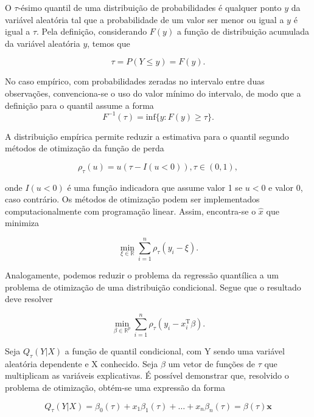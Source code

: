 O $\tau$-ésimo quantil de uma distribuição de probabilidades é qualquer ponto $y$ da variável aleatória tal que a probabilidade de um valor ser menor ou igual a $y$ é igual a $\tau$. Pela definição, considerando $F(y)$ a função de distribuição acumulada da variável aleatória $y$, temos que

\begin{equation}
\tau = P(Y \leq y) = F(y).
\end{equation}

No caso empírico, com probabilidades zeradas no intervalo entre duas observações, convenciona-se o uso do valor mínimo do intervalo, de modo que a definição para o quantil assume a forma
\begin{equation}
F^{-1}(\tau) = \text{inf}\{y: F(y) \geq \tau\}.
\end{equation}

A distribuição empírica permite reduzir a estimativa para o quantil segundo métodos de otimização da função de perda

\begin{equation}
\rho_\tau(u) = u(\tau - I(u < 0)), \tau \in (0, 1),
\end{equation}

\noindent onde $I(u < 0)$ é uma função indicadora que assume valor 1 se $u < 0$ e valor 0, caso contrário. Os métodos de otimização podem ser implementados computacionalmente com programação linear. Assim, encontra-se o $\hat{x}$ que minimiza

\begin{equation}
\displaystyle \min_{\xi \in \mathbb{R}} \displaystyle \sum_{i=1}^{n} \rho_\tau(y_i - \xi).
\end{equation}

Analogamente, podemos reduzir o problema da regressão quantílica a um problema de otimização de uma distribuição condicional. Segue que o resultado deve resolver

\begin{equation}
\displaystyle \min_{\beta \in \mathbb{R}^{p}} \displaystyle \sum_{i=1}^{n} \rho_\tau(y_i - x_i^{\text{T}}\beta).
\end{equation}


Seja $Q_\tau(Y | X)$ a função de quantil condicional, com Y sendo uma variável aleatória dependente e X conhecido. Seja $\beta$ um vetor de funções de $\tau$ que multiplicam as variáveis explicativas. É possível demonstrar que, resolvido o problema de otimização, obtém-se uma expressão da forma

\begin{equation}
Q_\tau(Y | X) = \beta_0(\tau) + x_1 \beta_1(\tau) + \dots + x_n \beta_n(\tau)  = {\beta} (\tau) \mathbf{x}
\end{equation}

